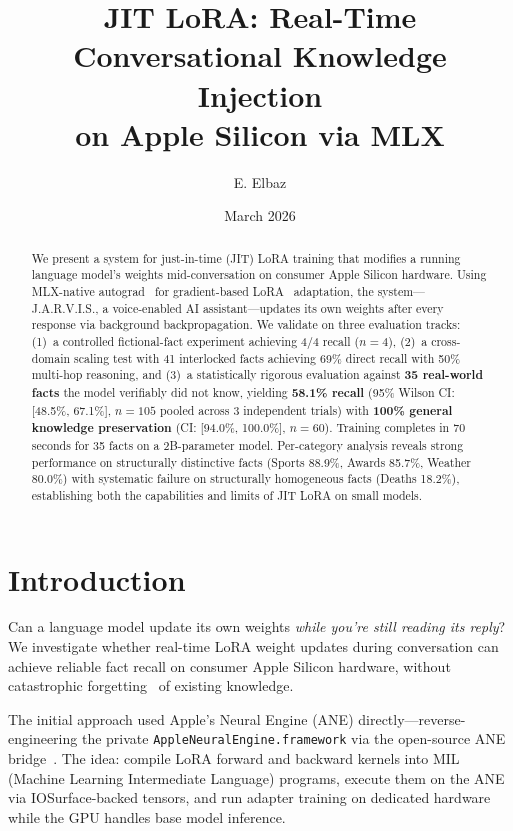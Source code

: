 \documentclass[11pt,a4paper]{article}
\title{JIT LoRA: Real-Time Conversational Knowledge Injection\\on Apple Silicon via MLX}
\author[1]{E. Elbaz}
\affil[1]{Independent Research}
\date{March 2026}
\begin{document}
\maketitle

\begin{abstract}
We present a system for just-in-time (JIT) LoRA training that modifies a running language model's weights mid-conversation on consumer Apple Silicon hardware. Using MLX-native autograd~\cite{mlx2023} for gradient-based LoRA~\cite{hu2021lora} adaptation, the system---J.A.R.V.I.S., a voice-enabled AI assistant---updates its own weights after every response via background backpropagation. We validate on three evaluation tracks: (1)~a controlled fictional-fact experiment achieving 4/4 recall ($n=4$), (2)~a cross-domain scaling test with 41 interlocked facts achieving 69\% direct recall with 50\% multi-hop reasoning, and (3)~a statistically rigorous evaluation against \textbf{35 real-world facts} the model verifiably did not know, yielding \textbf{58.1\% recall} (95\% Wilson CI: [48.5\%, 67.1\%], $n=105$ pooled across 3 independent trials) with \textbf{100\% general knowledge preservation} (CI: [94.0\%, 100.0\%], $n=60$). Training completes in 70 seconds for 35 facts on a 2B-parameter model. Per-category analysis reveals strong performance on structurally distinctive facts (Sports 88.9\%, Awards 85.7\%, Weather 80.0\%) with systematic failure on structurally homogeneous facts (Deaths 18.2\%), establishing both the capabilities and limits of JIT LoRA on small models.
\end{abstract}

\section{Introduction}

Can a language model update its own weights \emph{while you're still reading its reply}? We investigate whether real-time LoRA weight updates during conversation can achieve reliable fact recall on consumer Apple Silicon hardware, without catastrophic forgetting~\cite{mccloskey1989catastrophic} of existing knowledge.

The initial approach used Apple's Neural Engine (ANE) directly---reverse-engineering the private \texttt{AppleNeuralEngine.framework} via the open-source ANE bridge~\cite{ane_bridge}. The idea: compile LoRA forward and backward kernels into MIL (Machine Learning Intermediate Language) programs, execute them on the ANE via IOSurface-backed tensors, and run adapter training on dedicated hardware while the GPU handles base model inference.
\end{document}
